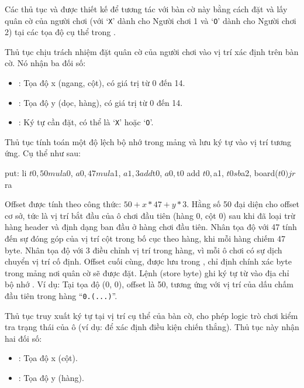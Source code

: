 Các thủ tục  và  được thiết kế để tương tác với bàn cờ này bằng cách đặt và lấy quân cờ của người chơi (với `\texttt{X}' dành cho Người chơi 1 và `\texttt{O}' dành cho Người chơi 2) tại các tọa độ cụ thể trong .

Thủ tục  chịu trách nhiệm đặt quân cờ của người chơi vào vị trí xác định trên bàn cờ. Nó nhận ba đối số:
\begin{itemize}
    \item {}: Tọa độ x (ngang, cột), có giá trị từ 0 đến 14.
    \item {}: Tọa độ y (dọc, hàng), có giá trị từ 0 đến 14.
    \item {}: Ký tự cần đặt, có thể là `\texttt{X}' hoặc `\texttt{O}'.
\end{itemize}

Thủ tục  tính toán một độ lệch bộ nhớ trong mảng  và lưu ký tự vào vị trí tương ứng. Cụ thể như sau:
\begin{code}
put:
    li $t0, 50
    mul $a0, $a0, 47
    mul $a1, $a1, 3
    add $t0, $a0, $t0
    add $t0, $a1, $t0
    sb $a2, board($t0)

    jr $ra
\end{code}

Offset được tính theo công thức: \( 50 + x * 47 + y * 3 \). Hằng số 50 đại diện cho offset cơ sở, tức là vị trí bắt đầu của ô chơi đầu tiên (hàng 0, cột 0) sau khi đã loại trừ hàng header và định dạng ban đầu ở hàng chơi đầu tiên. Nhân tọa độ  với 47 tính đến sự đóng góp của vị trí cột trong bố cục theo hàng, khi mỗi hàng chiếm 47 byte. Nhân tọa độ  với 3 điều chỉnh vị trí trong hàng, vì mỗi ô chơi có sự dịch chuyển vị trí cố định. Offset cuối cùng, được lưu trong , chỉ định chính xác byte trong mảng  nơi quân cờ sẽ được đặt. Lệnh  (store byte) ghi ký tự từ  vào địa chỉ bộ nhớ . Ví dụ: Tại tọa độ (0, 0), offset là 50, tương ứng với vị trí của dấu chấm đầu tiên trong hàng ``\texttt{0\vs\vs .\vs\vs (...)}''.

Thủ tục  truy xuất ký tự tại vị trí cụ thể của bàn cờ, cho phép logic trò chơi kiểm tra trạng thái của ô (ví dụ: để xác định điều kiện chiến thắng). Thủ tục này nhận hai đối số:
\begin{itemize}
    \item {}: Tọa độ x (cột).
    \item {}: Tọa độ y (hàng).
\end{itemize}


